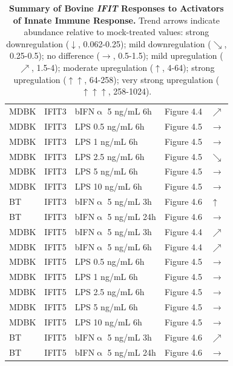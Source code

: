 \begin{table}
\begin{tabular}{lllll}
        MDBK & IFIT3 & bIFN$\upalpha$ 5 ng/mL 6h & Figure 4.4 & \(\nearrow\) \\ 
        MDBK & IFIT3 & LPS 0.5 ng/mL 6h & Figure 4.5 & \(\rightarrow\) \\ 
        MDBK & IFIT3 & LPS 1 ng/mL 6h & Figure 4.5 & \(\rightarrow\) \\ 
        MDBK & IFIT3 & LPS 2.5 ng/mL 6h & Figure 4.5 & \(\searrow\) \\ 
        MDBK & IFIT3 & LPS 5 ng/mL 6h & Figure 4.5 & \(\rightarrow\) \\ 
        MDBK & IFIT3 & LPS 10 ng/mL 6h & Figure 4.5 & \(\rightarrow\) \\ 
        BT & IFIT3 & bIFN$\upalpha$ 5 ng/mL 3h & Figure 4.6 & \(\uparrow\) \\ 
        BT & IFIT3 & bIFN$\upalpha$ 5 ng/mL 24h & Figure 4.6 & \(\rightarrow\) \\ 
        MDBK & IFIT5 & bIFN$\upalpha$ 5 ng/mL 3h & Figure 4.4 & \(\nearrow\) \\ 
        MDBK & IFIT5 & bIFN$\upalpha$ 5 ng/mL 6h & Figure 4.4 & \(\nearrow\) \\ 
        MDBK & IFIT5 & LPS 0.5 ng/mL 6h & Figure 4.5 & \(\rightarrow\) \\ 
        MDBK & IFIT5 & LPS 1 ng/mL 6h & Figure 4.5 & \(\rightarrow\) \\ 
        MDBK & IFIT5 & LPS 2.5 ng/mL 6h & Figure 4.5 & \(\rightarrow\) \\ 
        MDBK & IFIT5 & LPS 5 ng/mL 6h & Figure 4.5 & \(\rightarrow\) \\ 
        MDBK & IFIT5 & LPS 10 ng/mL 6h & Figure 4.5 & \(\rightarrow\) \\ 
        BT & IFIT5 & bIFN$\upalpha$ 5 ng/mL 3h & Figure 4.6 & \(\nearrow\) \\ 
        BT & IFIT5 & bIFN$\upalpha$ 5 ng/mL 24h & Figure 4.6 & \(\rightarrow\) \\ \hline
    \end{tabular}
	\caption[Summary of Bovine \textit{IFIT} Responses to Activators of Innate Immune Response.]{\textbf{Summary of Bovine \textit{IFIT} Responses to Activators of Innate Immune Response.} Trend arrows indicate abundance relative to mock-treated values: strong downregulation ($\downarrow$, 0.062-0.25); mild downregulation ($\searrow$, 0.25-0.5); no difference ($\rightarrow$, 0.5-1.5); mild upregulation ($\nearrow$, 1.5-4); moderate upregulation ($\uparrow$, 4-64); strong upregulation ($\uparrow\uparrow$, 64-258); very strong upregulation ($\uparrow\uparrow\uparrow$, 258-1024).}
    \label{tab:Summary of Bovine IFIT Responses to Activators of Innate Immune Response.}
\end{table}

